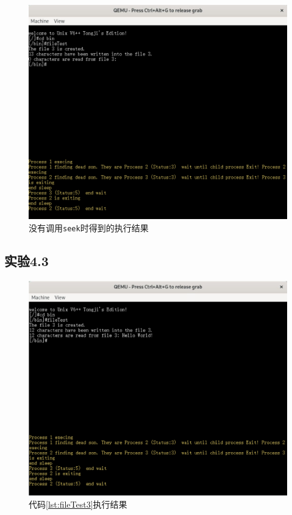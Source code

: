 \begin{figure}[!htbp]
    \centering
    \includegraphics[width=\textwidth]{images/p2noseek.png}
    \caption{没有调用\texttt{seek}时得到的执行结果}\label{p2noseek}
\end{figure}
\clearpage
\subsection{实验4.3}
\begin{figure}[!htbp]
    \centering
    \includegraphics[width=\textwidth]{images/p3.png}
    \caption{代码\ref{lst:fileTest3}执行结果}\label{p3}
\end{figure}
